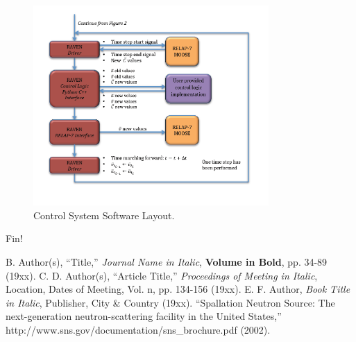 \documentclass{mc2013}
\begin{document}
\begin{figure}[h] 
  \centering
     \includegraphics[width=0.8\textwidth]{figures/CalculationFlow_part_2.PNG}
  \caption{Control System Software Layout.}
  \label{fig:CalcFlow2}
\end{figure}


Fin!


\setlength{\baselineskip}{12pt}
\begin{thebibliography}{300}
 B. Author(s), ``Title,'' {\it Journal Name in Italic}, 
          {\bf Volume in Bold}, pp. 34-89 (19xx).
 C. D. Author(s), ``Article Title,'' {\it Proceedings of
          Meeting in Italic}, Location, Dates of Meeting, Vol. n, pp. 134-156 
          (19xx).
 E. F. Author, {\it Book Title in Italic}, Publisher, City \&
          Country (19xx). 
 ``Spallation Neutron Source: The next-generation 
          neutron-scattering facility in the United States,'' 
          http://www.sns.gov/documentation/sns\_brochure.pdf (2002).
\end{thebibliography}
\end{document}
